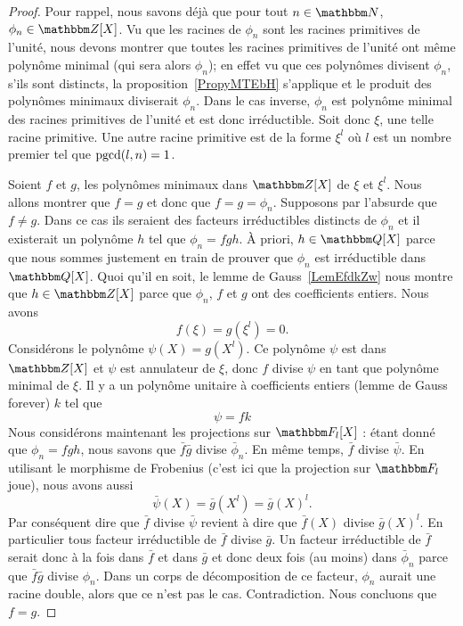 \begin{proof}
    Pour rappel, nous savons déjà que pour tout \( n\in\eN\), \( \phi_n\in \eZ[X]\). Vu que les racines de \( \phi_n\) sont les racines primitives de l'unité, nous devons montrer que toutes les racines primitives de l'unité ont même polynôme minimal (qui sera alors \( \phi_n\)); en effet vu que ces polynômes divisent \( \phi_n\), s'ils sont distincts, la proposition~\ref{PropyMTEbH} s'applique et le produit des polynômes minimaux diviserait \( \phi_n\). Dans le cas inverse, \( \phi_n\) est polynôme minimal des racines primitives de l'unité et est donc irréductible. Soit donc \( \xi\), une telle racine primitive. Une autre racine primitive est de la forme \( \xi^l\) où \( l\) est un nombre premier tel que \( \operatorname{pgcd}(l,n)=1\).

    Soient \( f\) et \( g\), les polynômes minimaux dans \( \eZ[X]\) de \( \xi\) et \( \xi^l\). Nous allons montrer que \( f=g\) et donc que \( f=g=\phi_n\). Supposons par l'absurde que \( f\neq g\). Dans ce cas ils seraient des facteurs irréductibles distincts de \( \phi_n\) et il existerait un polynôme \( h\) tel que \( \phi_n=fgh\). À priori, \( h\in \eQ[X]\) parce que nous sommes justement en train de prouver que \( \phi_n\) est irréductible dans \( \eQ[X]\). Quoi qu'il en soit, le lemme de Gauss~\ref{LemEfdkZw} nous montre que \( h\in \eZ[X]\) parce que \( \phi_n\), \( f\) et \( g\) ont des coefficients entiers. Nous avons
    \begin{equation}
        f(\xi)=g(\xi^l)=0.
    \end{equation}
    Considérons le polynôme \( \psi(X)=g(X^l)\). Ce polynôme \( \psi\) est dans \( \eZ[X]\) et \( \psi\) est annulateur de \( \xi\), donc \( f\) divise \( \psi\) en tant que polynôme minimal de \( \xi\). Il y a un polynôme unitaire à coefficients entiers (lemme de Gauss forever) \( k\) tel que
    \begin{equation}
        \psi=fk
    \end{equation}
    Nous considérons maintenant les projections sur \( \eF_l[X]\) : étant donné que \( \phi_n=fgh\), nous savons que \( \bar f\bar g\) divise \( \bar\phi_n\). En même temps, \( \bar f\) divise \( \bar \psi\). En utilisant le morphisme de Frobenius (c'est ici que la projection sur \( \eF_l\) joue), nous avons aussi
    \begin{equation}
        \bar\psi(X)=\bar g(X^l)=\bar g(X)^l.
    \end{equation}
    Par conséquent dire que \( \bar f\) divise \( \bar\psi\) revient à dire que \( \bar f(X)\) divise \( \bar g(X)^l\). En particulier tous facteur irréductible de \( \bar f\) divise \( \bar g\). Un facteur irréductible de \( \bar f\) serait donc à la fois dans \( \bar f\) et dans \( \bar g\) et donc deux fois (au moins) dans \( \bar\phi_n\) parce que \( \bar f\bar g\) divise \( \phi_n\). Dans un corps de décomposition de ce facteur, \( \phi_n\) aurait une racine double, alors que ce n'est pas le cas. Contradiction. Nous concluons que \( f=g\).
\end{proof}

